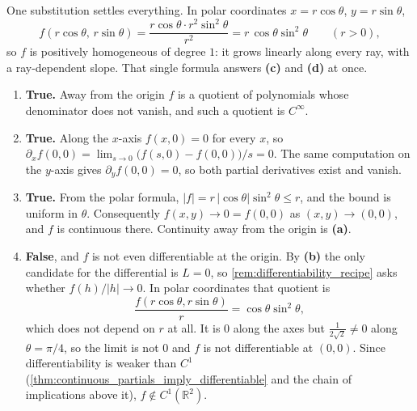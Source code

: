 \begin{exercisesolution}
\label{sol:regularity_ladder_xy2}
One substitution settles everything. In polar coordinates $x = r\cos\theta$, $y = r\sin\theta$,
\[f(r\cos\theta,\, r\sin\theta) = \frac{r\cos\theta \cdot r^2\sin^2\theta}{r^2}
  = r\,\cos\theta\sin^2\theta \qquad (r > 0),\]
so $f$ is positively homogeneous of degree $1$: it grows linearly along every ray, with a
ray-dependent slope. That single formula answers \textbf{(c)} and \textbf{(d)} at once.
\begin{enumerate}[label=\textbf{(\alph*)}]
  \item \textbf{True.} Away from the origin $f$ is a quotient of polynomials whose denominator does
    not vanish, and such a quotient is $C^\infty$.
  \item \textbf{True.} Along the $x$-axis $f(x,0) = 0$ for every $x$, so
    $\partial_xf(0,0) = \lim_{s\to0}\big(f(s,0)-f(0,0)\big)/s = 0$. The same computation on the
    $y$-axis gives $\partial_yf(0,0) = 0$, so both partial derivatives exist and vanish.
  \item \textbf{True.} From the polar formula,
    $\lvert f\rvert = r\,\lvert\cos\theta\rvert\sin^2\theta \leq r$, and the bound is uniform in
    $\theta$. Consequently $f(x,y) \to 0 = f(0,0)$ as $(x,y) \to (0,0)$, and $f$ is continuous
    there. Continuity away from the origin is \textbf{(a)}.
  \item \textbf{False}, and $f$ is not even differentiable at the origin. By \textbf{(b)} the only
    candidate for the differential is $L = 0$, so \cref{rem:differentiability_recipe} asks whether
    $f(h)/\lvert h\rvert \to 0$. In polar coordinates that quotient is
    \[\frac{f(r\cos\theta, r\sin\theta)}{r} = \cos\theta\sin^2\theta,\]
    which does not depend on $r$ at all. It is $0$ along the axes but
    $\tfrac{1}{2\sqrt2} \neq 0$ along $\theta = \pi/4$, so the limit is not $0$ and $f$ is not
    differentiable at $(0,0)$. Since differentiability is weaker than $C^1$
    (\cref{thm:continuous_partials_imply_differentiable} and the chain of implications above it),
    $f \notin C^1(\mathbb{R}^2)$.
\end{enumerate}

\end{exercisesolution}
